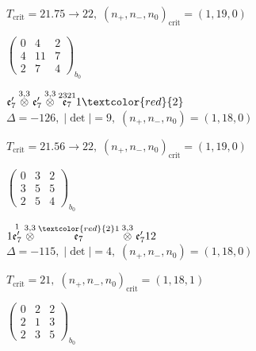\documentclass[10pt]{article}
\begin{document}
\hspace{1em}$T_{\text{crit}}=21.75 \to 22,\; (n_+,n_-,n_0)_{\text{crit}}=(1,19,0)$

\hspace{2em}$\left(\begin{smallmatrix}0 & 4 & 2 \\ 4 & 11 & 7 \\ 2 & 7 & 4\end{smallmatrix}\right)_{\!b_0}$

\smallskip

$\mathfrak{e}_7'\overset{3,3}{\otimes}\mathfrak{e}_7'\overset{3,3}{\otimes}\overset{2321}{\mathfrak{e}_7}1\textcolor{red}{2}$ \quad $\Delta=-126,\; |\det|=9,\; (n_+,n_-,n_0)=(1,18,0)$

\hspace{1em}$T_{\text{crit}}=21.56 \to 22,\; (n_+,n_-,n_0)_{\text{crit}}=(1,19,0)$

\hspace{2em}$\left(\begin{smallmatrix}0 & 3 & 2 \\ 3 & 5 & 5 \\ 2 & 5 & 4\end{smallmatrix}\right)_{\!b_0}$

\smallskip

$1\overset{1}{\mathfrak{e}_7'}\overset{3,3}{\otimes}\overset{\textcolor{red}{2}1}{\mathfrak{e}_7}\overset{3,3}{\otimes}\mathfrak{e}_7'12$ \quad $\Delta=-115,\; |\det|=4,\; (n_+,n_-,n_0)=(1,18,0)$

\hspace{1em}$T_{\text{crit}}=21,\; (n_+,n_-,n_0)_{\text{crit}}=(1,18,1)$

\hspace{2em}$\left(\begin{smallmatrix}0 & 2 & 2 \\ 2 & 1 & 3 \\ 2 & 3 & 5\end{smallmatrix}\right)_{\!b_0}$

\smallskip
\end{document}
